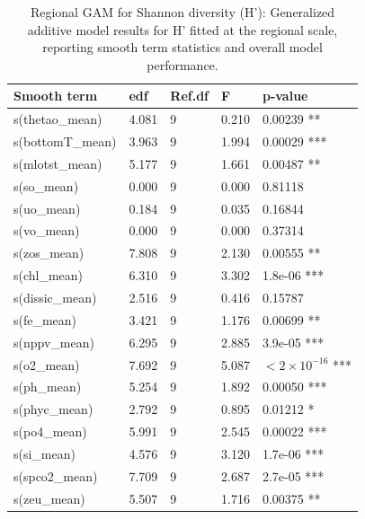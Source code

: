 \documentclass[a4paper,fleqn]{cas-sc}
\begin{document}
\begin{table}[width=.9\linewidth,cols=5,pos=!htbp]
\caption{Regional GAM for Shannon diversity (H'): Generalized additive model results for H' fitted at the regional scale, reporting smooth term statistics and overall model performance.}
\small
\begin{tabular*}{\tblwidth}{@{} LLLLL @{}}
\toprule
\textbf{Smooth term} & \textbf{edf} & \textbf{Ref.df} & \textbf{F} & \textbf{p-value} \\
\midrule
s(thetao\_mean)      & 4.081 & 9 & 0.210 & 0.00239 ** \\
s(bottomT\_mean) & 3.963 & 9 & 1.994 & 0.00029 *** \\
s(mlotst\_mean)   & 5.177 & 9 & 1.661 & 0.00487 ** \\
s(so\_mean)       & 0.000 & 9 & 0.000 & 0.81118 \\
s(uo\_mean)       & 0.184 & 9 & 0.035 & 0.16844 \\
s(vo\_mean)       & 0.000 & 9 & 0.000 & 0.37314 \\
s(zos\_mean)      & 7.808 & 9 & 2.130 & 0.00555 ** \\
s(chl\_mean)      & 6.310 & 9 & 3.302 & 1.8e-06 *** \\
s(dissic\_mean)   & 2.516 & 9 & 0.416 & 0.15787 \\
s(fe\_mean)       & 3.421 & 9 & 1.176 & 0.00699 ** \\
s(nppv\_mean)     & 6.295 & 9 & 2.885 & 3.9e-05 *** \\
s(o2\_mean)       & 7.692 & 9 & 5.087 & $<2 \times 10^{-16}$ *** \\
s(ph\_mean)       & 5.254 & 9 & 1.892 & 0.00050 *** \\
s(phyc\_mean)     & 2.792 & 9 & 0.895 & 0.01212 * \\
s(po4\_mean)      & 5.991 & 9 & 2.545 & 0.00022 *** \\
s(si\_mean)       & 4.576 & 9 & 3.120 & 1.7e-06 *** \\
s(spco2\_mean)    & 7.709 & 9 & 2.687 & 2.7e-05 *** \\
s(zeu\_mean)      & 5.507 & 9 & 1.716 & 0.00375 ** \\
\bottomrule
\end{tabular*}
\label{tab:19}
\end{table}
\end{document}
